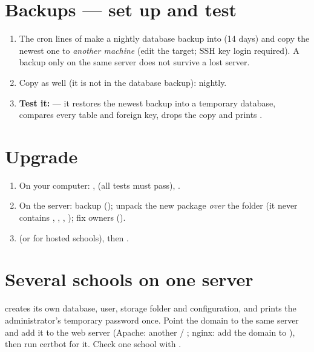 \documentclass[11pt,a4paper]{article}
\begin{document}
\section{Backups --- set up and test}
\label{sec:backups}
\begin{enumerate}
\item The cron lines of  make a nightly database backup into  (14 days) and copy the newest one to \emph{another machine} (edit the  target; SSH key login required). A backup only on the same server does not survive a lost server.
\item Copy  as well (it is not in the database backup):  nightly.
\item \textbf{Test it:}  --- it restores the newest backup into a temporary database, compares every table and foreign key, drops the copy and prints .
\end{enumerate}

\section{Upgrade}
\begin{enumerate}
\item On your computer: ,  (all tests must pass), .
\item On the server: backup (); unpack the new package \emph{over} the folder (it never contains , , , ); fix owners ().
\item {} (or  for hosted schools), then .
\end{enumerate}

\section{Several schools on one server}
\label{sec:multi}
 creates its own database, user, storage folder and configuration, and prints the administrator's temporary password once. Point the domain to the same server and add it to the web server (Apache: another  / ; nginx: add the domain to ), then run certbot for it. Check one school with .
\end{document}
